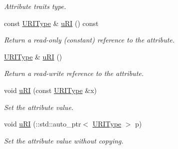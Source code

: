\begin{DoxyCompactItemize}
\begin{DoxyCompactList}\small\item\em Attribute traits type. \item\end{DoxyCompactList}\item 
const \hyperlink{classopenstack_1_1xml_1_1RateLimit_af7901803e96cb338e2560358c8ce931b}{URIType} \& \hyperlink{classopenstack_1_1xml_1_1RateLimit_aac52d5f8ccf1eb4377768df10c3dfd83}{uRI} () const 
\begin{DoxyCompactList}\small\item\em Return a read-\/only (constant) reference to the attribute. \item\end{DoxyCompactList}\item 
\hyperlink{classopenstack_1_1xml_1_1RateLimit_af7901803e96cb338e2560358c8ce931b}{URIType} \& \hyperlink{classopenstack_1_1xml_1_1RateLimit_a1154788c45af216d0ef9a3d465ae55de}{uRI} ()
\begin{DoxyCompactList}\small\item\em Return a read-\/write reference to the attribute. \item\end{DoxyCompactList}\item 
void \hyperlink{classopenstack_1_1xml_1_1RateLimit_a4086a4f2b8c0748ade2ddbee39588df6}{uRI} (const \hyperlink{classopenstack_1_1xml_1_1RateLimit_af7901803e96cb338e2560358c8ce931b}{URIType} \&x)
\begin{DoxyCompactList}\small\item\em Set the attribute value. \item\end{DoxyCompactList}\item 
void \hyperlink{classopenstack_1_1xml_1_1RateLimit_a42dc865f2ed3ff5355df4478dde7b951}{uRI} (::std::auto\_\-ptr$<$ \hyperlink{classopenstack_1_1xml_1_1RateLimit_af7901803e96cb338e2560358c8ce931b}{URIType} $>$ p)
\begin{DoxyCompactList}\small\item\em Set the attribute value without copying. \item\end{DoxyCompactList}\end{DoxyCompactItemize}
